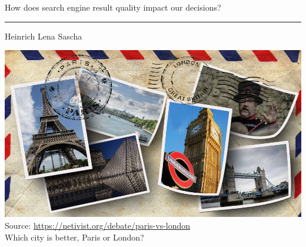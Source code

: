 \documentclass[4:3]{lecture}
\begin{document}
\pagestyle{empty}

\begin{bsslide}
  \begin{center}
    \hfill\vfill 
    {\large How does search engine result quality impact our decisions?}
    {\color{fsublue}\rule{\textwidth}{1.5pt}}
    \vspace*{0.25ex}
    Heinrich \hspace{4em} Lena \hspace{4em} Sascha
    \vspace*{1ex}
    \begin{center}
      \vspace{2ex}
      \includegraphics[width=0.65\linewidth]{paris-vs-london}\\[-1.5ex]
      {\tiny Source: \url{https://netivist.org/debate/paris-vs-london}}\\[1ex]
      \raisebox{0.2ex}{\textcolor{gray}{\small Thinking of}}
      {\large {} Which city is better, Paris or London?}
    \end{center}
    \vfill
  \end{center}
\end{bsslide}

\pagestyle{plain}
\end{document}
